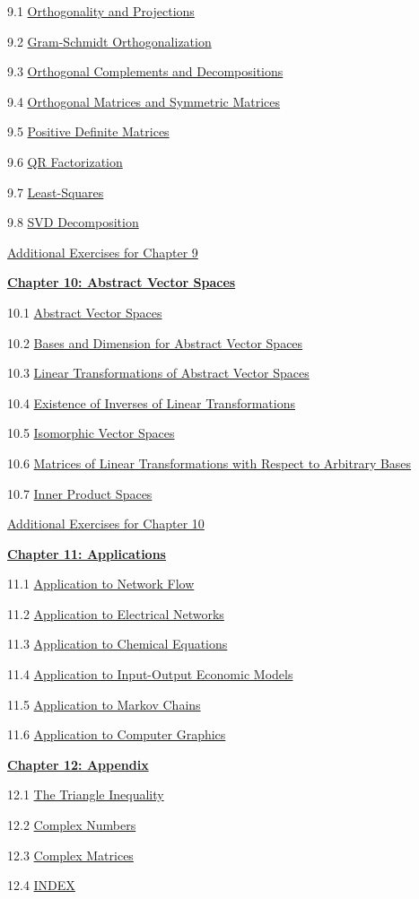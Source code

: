 \documentclass{ximera}
\begin{document}
9.1	\href{\xmbaseurl/RTH-0010/main}{Orthogonality and Projections}
	
9.2	\href{\xmbaseurl/RTH-0015/main}{Gram-Schmidt Orthogonalization}
	
9.3	\href{\xmbaseurl/RTH-0020/main}{Orthogonal Complements and Decompositions}
	
9.4	\href{\xmbaseurl/RTH-0035/main}{Orthogonal Matrices and Symmetric Matrices}
	
9.5	\href{\xmbaseurl/RTH-0045/main}{Positive Definite Matrices}
	
9.6	\href{\xmbaseurl/RTH-0040/main}{QR Factorization}
	
9.7	\href{\xmbaseurl/RTH-0030/main}{Least-Squares}
	
9.8	\href{\xmbaseurl/RTH-0060/main}{SVD Decomposition}
	
\href{\xmbaseurl/SUPX-0090/main}{Additional Exercises for Chapter 9}
	
\href{\xmbaseurl/XLAChapter_vecSpaces/main}{\textbf{Chapter 10: Abstract Vector Spaces}}
	
10.1	\href{\xmbaseurl/VSP-0050/main}{Abstract Vector Spaces}
	
10.2	\href{\xmbaseurl/VSP-0060/main}{Bases and Dimension for Abstract Vector Spaces}
	
10.3	\href{\xmbaseurl/LTR-0022/main}{Linear Transformations of Abstract Vector Spaces}
	
10.4	\href{\xmbaseurl/LTR-0025/main}{Existence of Inverses of Linear Transformations}
	
10.5	\href{\xmbaseurl/LTR-0035/main}{Isomorphic Vector Spaces}
	
10.6	\href{\xmbaseurl/LTR-0060/main}{Matrices of Linear Transformations with Respect to Arbitrary Bases}
	
10.7	\href{\xmbaseurl/LTR-0080/main}{Inner Product Spaces}
	
\href{\xmbaseurl/SUPX-0100/main}{Additional Exercises for Chapter 10}
	
\href{\xmbaseurl/XLAChapter_applications/main}{\textbf{Chapter 11: Applications}}
	
11.1	\href{\xmbaseurl/APP-0010/main}{Application to Network Flow}
	
11.2	\href{\xmbaseurl/APP-0020/main}{Application to Electrical Networks}
	
11.3	\href{\xmbaseurl/APP-0030/main}{Application to Chemical Equations}
	
11.4	\href{\xmbaseurl/APP-0050/main}{Application to Input-Output Economic Models}
	
11.5	\href{\xmbaseurl/APP-0060/main}{Application to Markov Chains}
	
11.6	\href{\xmbaseurl/APP-0040/main}{Application to Computer Graphics}
	
\href{\xmbaseurl/XLAChapter_appendix/main}{\textbf{Chapter 12: Appendix}}
	
12.1	\href{\xmbaseurl/APX-0010/main}{The Triangle Inequality}
	
12.2	\href{\xmbaseurl/APX-0020/main}{Complex Numbers}
	
12.3
\href{\xmbaseurl/RTH-0050/main}{Complex Matrices}
	
12.4	\href{\xmbaseurl/INDEX/main}{INDEX}
\end{document}
